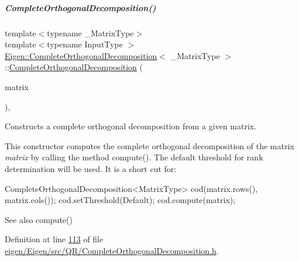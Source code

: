 \mbox{\label{group___q_r___module_afcfaf7a395f853247c23bb52b1ffb1cc}} 
\subparagraph{\texorpdfstring{Complete\+Orthogonal\+Decomposition()}{CompleteOrthogonalDecomposition()}\hspace{0.1cm}{\footnotesize\ttfamily [3/8]}}
{\footnotesize\ttfamily template$<$typename \+\_\+\+Matrix\+Type$>$ \\
template$<$typename Input\+Type $>$ \\
\hyperlink{group___q_r___module_class_eigen_1_1_complete_orthogonal_decomposition}{Eigen\+::\+Complete\+Orthogonal\+Decomposition}$<$ \+\_\+\+Matrix\+Type $>$\+::\hyperlink{group___q_r___module_class_eigen_1_1_complete_orthogonal_decomposition}{Complete\+Orthogonal\+Decomposition} (\begin{DoxyParamCaption}\item[{const \hyperlink{group___core___module_struct_eigen_1_1_eigen_base}{Eigen\+Base}$<$ Input\+Type $>$ \&}]{matrix }\end{DoxyParamCaption})\hspace{0.3cm}{\ttfamily [inline]}, {\ttfamily [explicit]}}



Constructs a complete orthogonal decomposition from a given matrix. 

This constructor computes the complete orthogonal decomposition of the matrix {\itshape matrix} by calling the method compute(). The default threshold for rank determination will be used. It is a short cut for\+:


\begin{DoxyCode}
CompleteOrthogonalDecomposition<MatrixType> cod(matrix.rows(),
                                                matrix.cols());
cod.setThreshold(Default);
cod.compute(matrix);
\end{DoxyCode}


\begin{DoxySeeAlso}{See also}
compute() 
\end{DoxySeeAlso}


Definition at line \hyperlink{eigen_2_eigen_2src_2_q_r_2_complete_orthogonal_decomposition_8h_source_l00113}{113} of file \hyperlink{eigen_2_eigen_2src_2_q_r_2_complete_orthogonal_decomposition_8h_source}{eigen/\+Eigen/src/\+Q\+R/\+Complete\+Orthogonal\+Decomposition.\+h}.

